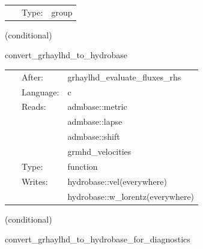 \hspace{5mm}{\it convert hydrobase initial data to grhaylhd variables } 


\hspace{5mm}

 \begin{tabular*}{160mm}{cll} 
~ & Type:  & group \\ 
\end{tabular*} 


\vspace{5mm}

   (conditional) 

\hspace{5mm} convert\_grhaylhd\_to\_hydrobase 

\hspace{5mm}{\it convert needed hydrobase variables for nrpyleakage } 


\hspace{5mm}

 \begin{tabular*}{160mm}{cll} 
~ & After:  & grhaylhd\_evaluate\_fluxes\_rhs \\ 
~ & Language:  & c \\ 
~ & Reads:  & admbase::metric \\ 
~& ~ &admbase::lapse\\ 
~& ~ &admbase::shift\\ 
~& ~ &grmhd\_velocities\\ 
~ & Type:  & function \\ 
~ & Writes:  & hydrobase::vel(everywhere) \\ 
~& ~ &hydrobase::w\_lorentz(everywhere)\\ 
\end{tabular*} 


\vspace{5mm}

   (conditional) 

\hspace{5mm} convert\_grhaylhd\_to\_hydrobase\_for\_diagnostics 

\hspace{5mm}{\it convert grhaylhd-native variables to hydrobase } 


\hspace{5mm}

